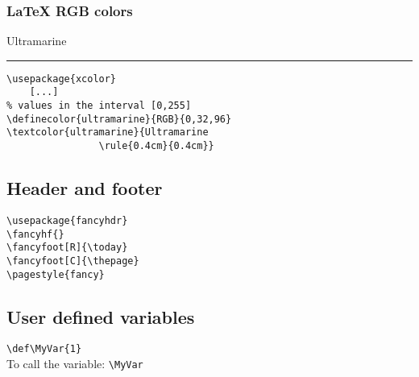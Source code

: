 \subsubsection{LaTeX RGB colors}
\textcolor{ultramarine}{Ultramarine \rule{0.4cm}{0.4cm}}
\begin{minipage}[c]{3cm}
  \begin{verbatim}
\usepackage{xcolor}
    [...]
% values in the interval [0,255]
\definecolor{ultramarine}{RGB}{0,32,96}
\textcolor{ultramarine}{Ultramarine
                \rule{0.4cm}{0.4cm}}
  \end{verbatim}
\end{minipage}

\subsection{Header and footer}
\begin{verbatim}
\usepackage{fancyhdr}
\fancyhf{}
\fancyfoot[R]{\today}
\fancyfoot[C]{\thepage}
\pagestyle{fancy}
\end{verbatim}

\subsection{User defined variables}
\verb|\def\MyVar{1}|\\
To call the variable: \verb|\MyVar|
